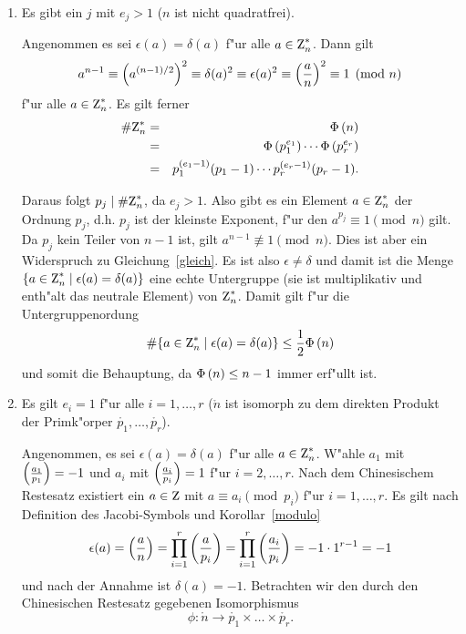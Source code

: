 \begin{enumerate}
\item Es gibt ein $j$ mit $e_j > 1$ ($n$ ist nicht quadratfrei).

      Angenommen es sei $\epsilon(a)=\delta(a)$ f"ur alle 
      $a\in\einheit{n}$. Dann gilt 
      \begin{equation}
        a^{n-1} \equiv \left(a^{(n-1)/2}\right)^2 \equiv \delta(a)^2
        \equiv \epsilon(a)^2 \equiv \left(\frac{a}{n}\right)^2 \equiv 1 \pmod{n}
        \label{gleich}
      \end{equation}
      f"ur alle $a\in\einheit{n}$. Es gilt ferner 
      \begin{eqnarray*}
        \#\einheit{n} & = & \euler{n} \\
                      & = & \euler{p_1^{e_1}} \cdots \euler{p_r^{e_r}} \\
                      & = & p_1^{(e_1-1)}(p_1-1) \cdots p_r^{(e_r-1)}(p_r-1).
      \end{eqnarray*}

      Daraus folgt $p_j \mid \#\einheit{n}$, da $e_j > 1$. Also gibt
      es ein Element $a\in\einheit{n}$ der Ordnung $p_j$, d.h. $p_j$
      ist der kleinste Exponent, f"ur den $a^{p_j} \equiv 1 \pmod{n}$
      gilt. Da $p_j$ kein Teiler von $n-1$ ist, gilt $a^{n-1}
      \not\equiv 1 \pmod{n}$.  Dies ist aber ein Widerspruch zu
      Gleichung~\ref{gleich}. Es ist also $\epsilon \neq \delta$ und
      damit ist die Menge
      $\{a\in\einheit{n}\mid\epsilon(a)=\delta(a)\}$ eine echte
      Untergruppe (sie ist multiplikativ und enth"alt das neutrale
      Element) von $\einheit{n}$.  Damit gilt f"ur die
      Untergruppenordung
      $$\#\{a\in\einheit{n}\mid\epsilon(a)=\delta(a)\} \le {1 \over 2}\euler{n} $$
      und somit die Behauptung, da $\Phi\left( n \right) \le n-1$ immer erf"ullt ist.
\item Es gilt $e_i=1$ f"ur alle $i=1,\ldots, r$ ($\ring{n}$ ist isomorph 
      zu dem direkten Produkt der Primk"orper $\ring{p_1},\ldots ,\ring{p_r}$).

      Angenommen, es sei $\epsilon(a)=\delta(a)$ f"ur alle
      $a\in\einheit{n}$. W"ahle $a_1$ mit $\left(\frac{a_1}{p_1}\right)=-1$ und
      $a_i$ mit $\left(\frac{a_i}{p_i}\right)=1$ f"ur
      $i=2,\ldots,r$. Nach dem Chinesischem Restesatz existiert ein
      $a\in\Z$ mit $a\equiv a_i \pmod{p_i}$ f"ur $i=1,\ldots,r$. Es
      gilt nach Definition des Jacobi-Symbols und
      Korollar~\ref{modulo}
      $$ \epsilon(a) = \left(\frac{a}{n}\right) = \prod_{i=1}^{r} \left(\frac{a}{p_i}\right) = 
         \prod_{i=1}^r \left(\frac{a_i}{p_i}\right) = -1 \cdot 1^{r-1} = -1 $$
      und nach der Annahme ist $\delta(a)=-1$. Betrachten wir den 
      durch den Chinesischen Restesatz gegebenen Isomorphismus
      $$ \phi :  \ring{n} \longrightarrow \ring{p_1} \times \ldots 
         \times \ring{p_r}.$$


\end{enumerate}
